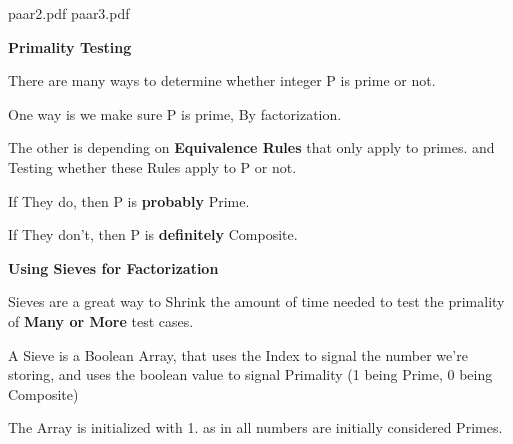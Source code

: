 \documentclass{slides}
\begin{document}
\newpage
 {paar2.pdf}
 {paar3.pdf}
\newpage
\begin{center}
\textbf{\Large Primality Testing}
\end{center}
\begin{center}
There are many ways to determine whether integer P is prime or not.
\end{center}
\begin{center}
One way is we make sure P is prime, By factorization.
\end{center}
\begin{center}
The other is depending on \textbf{Equivalence Rules} that only apply to primes. and Testing whether these Rules apply to P or not.
\end{center}
\begin{center}
If They do, then P is \textbf{probably} Prime.
\end{center}
\begin{center}
If They don't, then P is \textbf{definitely} Composite.
\end{center}
\newpage
\begin{center}
\textbf{\Large Using Sieves for Factorization}
\end{center}
\begin{center}
Sieves are a great way to Shrink the amount of time needed to test the primality of \textbf{Many or More} test cases.
\end{center}
\begin{center}
A Sieve is a Boolean Array, that uses the Index to signal the number we're storing, and uses the boolean value to signal Primality (1 being Prime, 0 being Composite)
\end{center}
\begin{center}
The Array is initialized with 1. as in all numbers are initially considered Primes.
\end{center}
\end{document}
